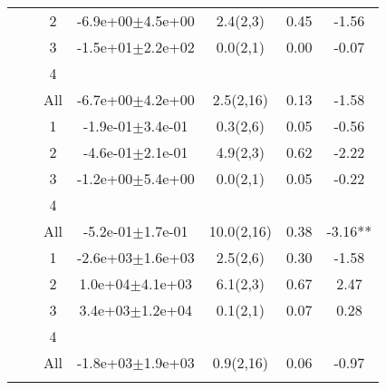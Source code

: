 \begin{longtable}{llccccS[table-format=-2.2, table-space-text-post = {***}]}
   &  & 2 & -6.9e+00$\pm$4.5e+00 & 2.4(2,3) & 0.45 & -1.56 \\ 
   &  & 3 & -1.5e+01$\pm$2.2e+02 & 0.0(2,1) & 0.00 & -0.07 \\ 
   &  & 4 &  &  &  &  \\ 
   &  & All & -6.7e+00$\pm$4.2e+00 & 2.5(2,16) & 0.13 & -1.58 \\ 
   \midrule
{} & {} & 1 & -1.9e-01$\pm$3.4e-01 & 0.3(2,6) & 0.05 & -0.56 \\ 
   &  & 2 & -4.6e-01$\pm$2.1e-01 & 4.9(2,3) & 0.62 & -2.22 \\ 
   &  & 3 & -1.2e+00$\pm$5.4e+00 & 0.0(2,1) & 0.05 & -0.22 \\ 
   &  & 4 &  &  &  &  \\ 
   &  & All & -5.2e-01$\pm$1.7e-01 & 10.0(2,16) & 0.38 & -3.16** \\ 
   \midrule
{} & {} & 1 & -2.6e+03$\pm$1.6e+03 & 2.5(2,6) & 0.30 & -1.58 \\ 
   &  & 2 &  1.0e+04$\pm$4.1e+03 & 6.1(2,3) & 0.67 & 2.47 \\ 
   &  & 3 &  3.4e+03$\pm$1.2e+04 & 0.1(2,1) & 0.07 & 0.28 \\ 
   &  & 4 &  &  &  &  \\ 
   &  & All & -1.8e+03$\pm$1.9e+03 & 0.9(2,16) & 0.06 & -0.97 \\ 
   \bottomrule
\label{bivar_lm_summ}
\end{longtable}

